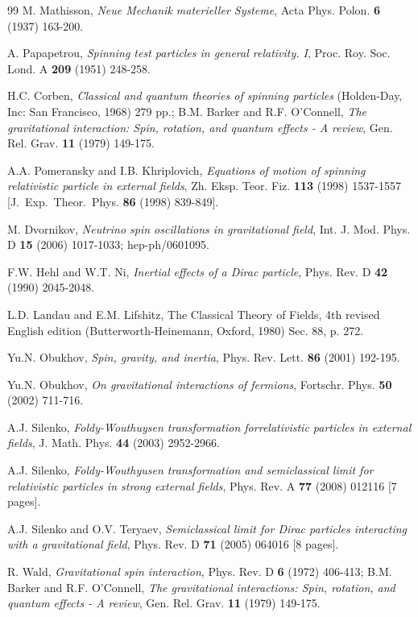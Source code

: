 \documentclass[preprint,showpacs,preprintnumbers,amsmath,amssymb]{revtex4}
\begin{document}
\begin{thebibliography}{99}
M. Mathisson, {\it Neue Mechanik materieller Systeme},
{Acta Phys. Polon.} {\bf 6} (1937) 163-200.

A. Papapetrou, 
{\it Spinning test particles in general relativity. I}, 
Proc. Roy. Soc. Lond. A {\bf 209} (1951) 248-258.

H.C. Corben, {\it Classical and quantum theories of spinning particles}
(Holden-Day, Inc: San Francisco, 1968) 279 pp.;
B.M. Barker and R.F. O'Connell,
{\it The gravitational interaction: Spin, rotation, and quantum effects -
A review},
Gen. Rel. Grav. {\bf 11} (1979) 149-175.

A.A. Pomeransky and I.B. Khriplovich,
{\it Equations of motion of spinning relativistic particle in external 
fields}, Zh. Eksp. Teor. Fiz. {\bf 113} (1998) 1537-1557 [J.\ Exp.\ Theor.\
Phys. {\bf 86} (1998) 839-849].

M. Dvornikov,
{\it Neutrino spin oscillations in gravitational field},
Int. J. Mod. Phys. D \textbf{15} (2006) 1017-1033; hep-ph/0601095.

F.W. Hehl and W.T. Ni,
{\it Inertial effects of a Dirac particle},
Phys. Rev. D {\bf 42} (1990) 2045-2048.

L.D. Landau and E.M. Lifshitz, The Classical Theory of Fields, 4th
revised English edition (Butterworth-Heinemann, Oxford, 1980)
Sec. 88, p. 272.

Yu.N. Obukhov, {\it Spin, gravity, and inertia}, Phys. Rev. Lett. 
{\bf 86} (2001) 192-195. 

Yu.N. Obukhov, {\it On gravitational interactions of fermions}, 
Fortschr. Phys. {\bf 50} (2002) 711-716.

A.J. Silenko,
{\it Foldy-Wouthuysen transformation forrelativistic particles 
in external fields}, J. Math. Phys. {\bf 44} (2003) 2952-2966.

A.J. Silenko,
{\it Foldy-Wouthyusen transformation and semiclassical limit 
for relativistic particles in strong external fields},
Phys. Rev. A \textbf{77} (2008) 012116 [7 pages].

A.J. Silenko and O.V. Teryaev,
{\it Semiclassical limit for Dirac particles interacting with 
a gravitational field},
Phys. Rev. D {\bf 71} (2005) 064016 [8 pages].

R. Wald,
{\it Gravitational spin interaction},
Phys. Rev. D {\bf 6} (1972) 406-413;
B.M. Barker and R.F. O'Connell,
{\it The gravitational interactions: Spin, rotation, and
quantum effects - A review},
Gen. Rel. Grav. {\bf 11} (1979) 149-175.


\end{thebibliography}
\end{document}
